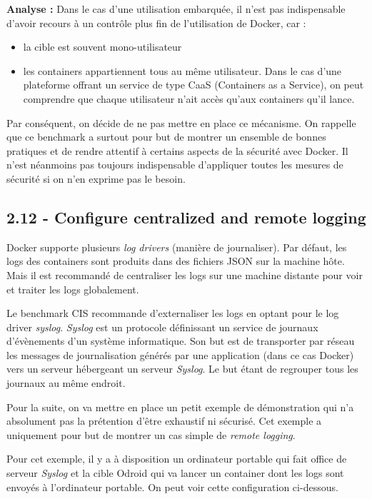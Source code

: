 \documentclass[11pt,a4paper,oneside]{report}
\begin{document}
\textbf{Analyse : } Dans le cas d'une utilisation embarquée, il n'est pas indispensable d'avoir recours à un contrôle plus fin de l'utilisation de Docker, car :
\begin{itemize}
\item la cible est souvent mono-utilisateur
\item les containers appartiennent tous au même utilisateur. Dans le cas d'une plateforme offrant un service de type CaaS (Containers as a Service), on peut comprendre que chaque utilisateur n'ait accès qu'aux containers qu'il lance.
\end{itemize}
Par conséquent, on décide de ne pas mettre en place ce mécanisme. On rappelle que ce benchmark a surtout pour but de montrer un ensemble de bonnes pratiques et de rendre attentif à certains aspects de la sécurité avec Docker. Il n'est néanmoins pas toujours indispensable d'appliquer toutes les mesures de sécurité si on n’en exprime pas le besoin.


\subsection{2.12 - Configure centralized and remote logging}
Docker supporte plusieurs \textit{log drivers} (manière de journaliser). Par défaut, les logs des containers sont produits dans des fichiers JSON sur la machine hôte. Mais il est recommandé de centraliser les logs sur une machine distante pour voir et traiter les logs globalement.

Le benchmark CIS recommande d'externaliser les logs en optant pour le log driver \textit{syslog}. \textit{Syslog}\cite{developpez_syslog}\cite{wiki_syslog} est un protocole définissant un service de journaux d'évènements d'un système informatique. Son but est de transporter par réseau les messages de journalisation générés par une application (dans ce cas Docker) vers un serveur hébergeant un serveur \textit{Syslog}. Le but étant de regrouper tous les journaux au même endroit.

Pour la suite, on va mettre en place un petit exemple de démonstration qui n'a absolument pas la prétention d'être exhaustif ni sécurisé. Cet exemple a uniquement pour but de montrer un cas simple de \textit{remote logging}.

Pour cet exemple, il y a à disposition un ordinateur portable qui fait office de serveur \textit{Syslog} et la cible Odroid qui va lancer un container dont les logs sont envoyés à l'ordinateur portable. On peut voir cette configuration ci-dessous.
\end{document}

